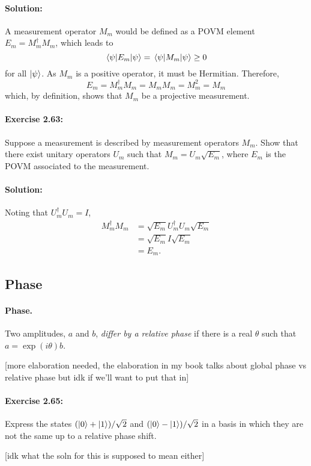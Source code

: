 \paragraph{Solution:} A measurement operator $M_m$ would be defined as a
POVM element $E_m = M_m^{\dagger}M_m$, which leads to \begin{equation*}
  \mel{\psi}{E_m}{\psi} = \mel{\psi}{M_m}{\psi} \geq 0
\end{equation*} for all $\ket{\psi}$. As $M_m$ is a positive operator, it must
be Hermitian. Therefore, \begin{equation*}
  E_m = M_m^{\dagger}M_m = M_mM_m = M_m^2 = M_m
\end{equation*} which, by definition, shows that $M_m$ be a projective
measurement.

\paragraph{\cite{mikeandike} Exercise 2.63:} Suppose a measurement is described
by measurement operators $M_m$. Show that there exist unitary operators $U_m$
such that $M_m = U_m\sqrt{E_m}$, where $E_m$ is the POVM associated to the
measurement.

\paragraph{Solution:} Noting that $U_m^{\dagger}U_m = I$, \begin{align*}
  M_m^{\dagger}M_m
  &= \sqrt{E_m}U_m^{\dagger}U_m\sqrt{E_m} \\
  &= \sqrt{E_m}I\sqrt{E_m} \\
  &= E_m.
\end{align*}

\subsection{Phase}

\paragraph{Phase.} Two amplitudes, $a$ and $b$, \emph{differ by a relative
phase} if there is a real $\theta$ such that $a = \exp(i\theta)b$.

[more elaboration needed, the elaboration in my book talks about global phase
vs relative phase but idk if we'll want to put that in]

\paragraph{\cite{mikeandike} Exercise 2.65:} Express the states $(\ket{0} +
\ket{1})/\sqrt{2}$ and $(\ket{0} - \ket{1})/\sqrt{2}$ in a basis in which they
are not the same up to a relative phase shift.

[idk what the soln for this is supposed to mean either]

